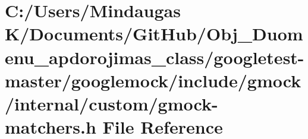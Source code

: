 \hypertarget{googletest-master_2googlemock_2include_2gmock_2internal_2custom_2gmock-matchers_8h}{}\section{C\+:/\+Users/\+Mindaugas K/\+Documents/\+Git\+Hub/\+Obj\+\_\+\+Duomenu\+\_\+apdorojimas\+\_\+class/googletest-\/master/googlemock/include/gmock/internal/custom/gmock-\/matchers.h File Reference}
\label{googletest-master_2googlemock_2include_2gmock_2internal_2custom_2gmock-matchers_8h}
